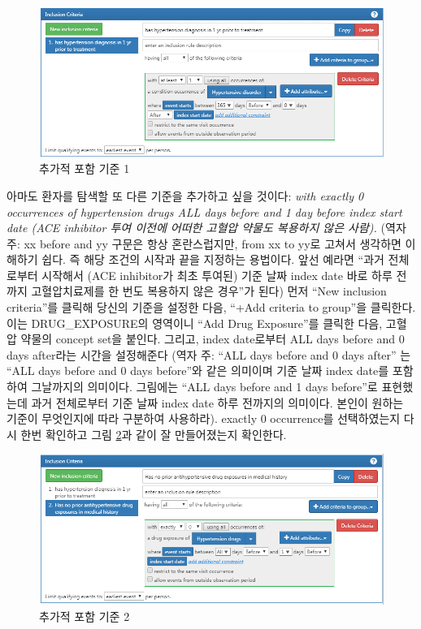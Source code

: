 \documentclass[10.5pt]{book}
\theoremstyle{definition}
\theoremstyle{definition}
\theoremstyle{definition}
\theoremstyle{remark}
\begin{document}
\begin{figure}

{\centering \includegraphics[width=1\linewidth]{images/Cohorts/ATLAS-IC1} 

}

\caption{추가적 포함 기준 1}\label{fig:ATLASIC1}
\end{figure}

아마도 환자를 탐색할 또 다른 기준을 추가하고 싶을 것이다: \emph{with
exactly 0 occurrences of hypertension drugs ALL days before and 1 day
before index start date (ACE inhibitor 투여 이전에 어떠한 고혈압 약물도
복용하지 않은 사람).} (역자 주: xx before and yy 구문은 항상
혼란스럽지만, from xx to yy로 고쳐서 생각하면 이해하기 쉽다. 즉 해당
조건의 시작과 끝을 지정하는 용법이다. 앞선 예라면 ``과거 전체로부터
시작해서 (ACE inhibitor가 최초 투여된) 기준 날짜 index date 바로 하루
전까지 고혈압치료제를 한 번도 복용하지 않은 경우''가 된다) 먼저 ``New
inclusion criteria''를 클릭해 당신의 기준을 설정한 다음, ``+Add criteria
to group''을 클릭한다. 이는 DRUG\_EXPOSURE의 영역이니 ``Add Drug
Exposure''를 클릭한 다음, 고혈압 약물의 concept set을 붙인다. 그리고,
index date로부터 ALL days before and 0 days after라는 시간을 설정해준다
(역자 주: ``ALL days before and 0 days after'' 는 ``ALL days before and
0 days before''와 같은 의미이며 기준 날짜 index date를 포함하여
그날까지의 의미이다. 그림에는 ``ALL days before and 1 days before''로
표현했는데 과거 전체로부터 기준 날짜 index date 하루 전까지의 의미이다.
본인이 원하는 기준이 무엇인지에 따라 구분하여 사용하라). exactly 0
occurrence를 선택하였는지 다시 한번 확인하고 그림 \ref{fig:ATLASIC2}과
같이 잘 만들어졌는지 확인한다.

\begin{figure}

{\centering \includegraphics[width=1\linewidth]{images/Cohorts/ATLAS-IC2} 

}

\caption{추가적 포함 기준 2}\label{fig:ATLASIC2}
\end{figure}
\end{document}
